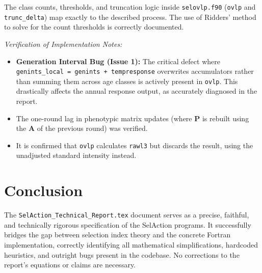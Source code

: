 \documentclass[11pt]{article}
\newcommand{\src}[1]{\texttt{#1}}
\begin{document}
The class counts, thresholds, and truncation logic inside \src{selovlp.f90} (\src{ovlp} and \src{trunc\_delta}) map exactly to the described process. The use of Ridders' method to solve for the count thresholds is correctly documented. 

\emph{Verification of Implementation Notes:}
\begin{itemize}
    \item \textbf{Generation Interval Bug (Issue 1):} The critical defect where \src{genints\_local = genints + tempresponse} overwrites accumulators rather than summing them across age classes is actively present in \src{ovlp}. This drastically affects the annual response output, as accurately diagnosed in the report.
    \item The one-round lag in phenotypic matrix updates (where $\mathbf{P}$ is rebuilt using the $\mathbf{A}$ of the previous round) was verified.
    \item It is confirmed that \src{ovlp} calculates \src{rawl3} but discards the result, using the unadjusted standard intensity instead.
\end{itemize}

\section{Conclusion}
The \src{SelAction\_Technical\_Report.tex} document serves as a precise, faithful, and technically rigorous specification of the SelAction programs. It successfully bridges the gap between selection index theory and the concrete Fortran implementation, correctly identifying all mathematical simplifications, hardcoded heuristics, and outright bugs present in the codebase. No corrections to the report's equations or claims are necessary.
\end{document}
